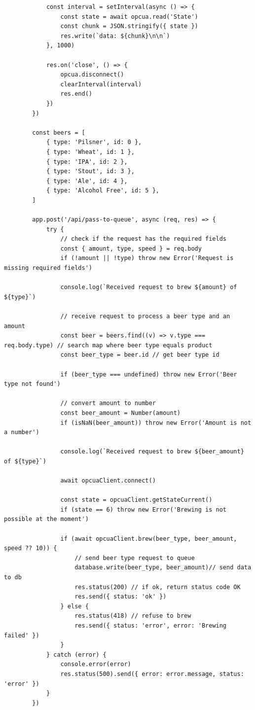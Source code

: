 \begin{center}
\begin{verbatim}
            const interval = setInterval(async () => {
                const state = await opcua.read('State')
                const chunk = JSON.stringify({ state })
                res.write(`data: ${chunk}\n\n`)
            }, 1000)

            res.on('close', () => {
                opcua.disconnect()
                clearInterval(interval)
                res.end()
            })
        })

        const beers = [
            { type: 'Pilsner', id: 0 },
            { type: 'Wheat', id: 1 },
            { type: 'IPA', id: 2 },
            { type: 'Stout', id: 3 },
            { type: 'Ale', id: 4 },
            { type: 'Alcohol Free', id: 5 },
        ]

        app.post('/api/pass-to-queue', async (req, res) => {
            try {
                // check if the request has the required fields
                const { amount, type, speed } = req.body
                if (!amount || !type) throw new Error('Request is missing required fields')

                console.log(`Received request to brew ${amount} of ${type}`)

                // receive request to process a beer type and an amount
                const beer = beers.find((v) => v.type === req.body.type) // search map where beer type equals product
                const beer_type = beer.id // get beer type id

                if (beer_type === undefined) throw new Error('Beer type not found')

                // convert amount to number
                const beer_amount = Number(amount)
                if (isNaN(beer_amount)) throw new Error('Amount is not a number')

                console.log(`Received request to brew ${beer_amount} of ${type}`)

                await opcuaClient.connect()

                const state = opcuaClient.getStateCurrent()
                if (state == 6) throw new Error('Brewing is not possible at the moment')

                if (await opcuaClient.brew(beer_type, beer_amount, speed ?? 10)) {
                    // send beer type request to queue
                    database.write(beer_type, beer_amount)// send data to db
                    res.status(200) // if ok, return status code OK
                    res.send({ status: 'ok' })
                } else {
                    res.status(418) // refuse to brew
                    res.send({ status: 'error', error: 'Brewing failed' })
                }
            } catch (error) {
                console.error(error)
                res.status(500).send({ error: error.message, status: 'error' })
            }
        })


\end{verbatim}
\end{center}
